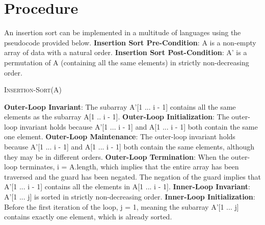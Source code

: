 \documentclass[onecolumn, 12pt, article]{IEEEtran}
\numberwithin{case}{problem}
\numberwithin{condition}{problem}
\numberwithin{condition}{subsection}
\numberwithin{definition}{section}
\theoremstyle{remark}
\numberwithin{question}{problem}
\theoremstyle{plain}
\numberwithin{answer}{problem}
\numberwithin{solution}{section}
\numberwithin{equation}{section}%
\begin{document}
\section{Procedure}
An insertion sort can be implemented in a multitude of languages using the pseudocode provided below.
\newline
\textbf{Insertion Sort Pre-Condition}: A is a non-empty array of data with a natural order.
\newline
\textbf{Insertion Sort Post-Condition}: A' is a permutation of A (containing all the same elements) in strictly non-decreasing order.
\begin{algorithm}
\caption {\textsc{Insertion-Sort}(A)}
\label{algo:insertionsort}
\begin{algorithmic}[1]
\EndIf
{}
	\EndWhile
\EndWhile
\EndProcedure
\end{algorithmic}
\end{algorithm}
\newline
\textbf{Outer-Loop Invariant}: The subarray A'[1 ... i - 1] contains all the same elements as the subarray A[1 .. i - 1].
\newline 
\textbf{Outer-Loop Initialization}: The outer-loop invariant holds because A'[1 ... i - 1] and A[1 ... i - 1] both contain the same one element.
\newline
\textbf{Outer-Loop Maintenance}: The outer-loop invariant holds because A'[1 ... i - 1] and A[1 ... i - 1] both contain the same elements, although they may be in different orders.
\newline
\textbf{Outer-Loop Termination}: When the outer-loop terminates, i = A.length, which implies that the entire array has been traversed and the guard has been negated. The negation of the guard implies that A'[1 ... i - 1] contains all the elements in A[1 ... i - 1].
\newline
\newline
\textbf{Inner-Loop Invariant}: A'[1 ... j] is sorted in strictly non-decreasing order.
\newline
\textbf{Inner-Loop Initialization}: Before the first iteration of the loop, j = 1, meaning the subarray A'[1 ... j] contains exactly one element, which is already sorted.
\newline
\end{document}
